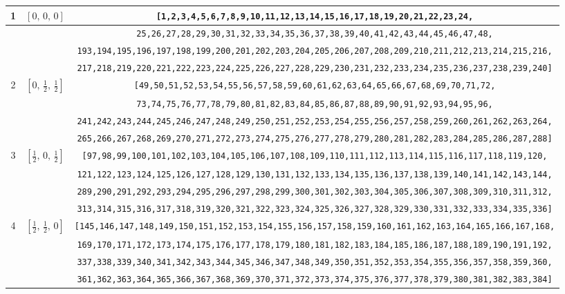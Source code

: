 \documentclass[fleqn,8pt]{jsarticle}
\begin{document}
\begin{longtable}{ccc}
1 & $\left[ 0,\, 0,\, 0 \right]$ & {\tt [1,2,3,4,5,6,7,8,9,10,11,12,13,14,15,16,17,18,19,20,21,22,23,24,} \\ \hline
 &  & {\tt 25,26,27,28,29,30,31,32,33,34,35,36,37,38,39,40,41,42,43,44,45,46,47,48,} \\ \hline
 &  & {\tt 193,194,195,196,197,198,199,200,201,202,203,204,205,206,207,208,209,210,211,212,213,214,215,216,} \\ \hline
 &  & {\tt 217,218,219,220,221,222,223,224,225,226,227,228,229,230,231,232,233,234,235,236,237,238,239,240]} \\ \hline
2 & $\left[ 0,\, \frac{1}{2},\, \frac{1}{2} \right]$ & {\tt [49,50,51,52,53,54,55,56,57,58,59,60,61,62,63,64,65,66,67,68,69,70,71,72,} \\ \hline
 &  & {\tt 73,74,75,76,77,78,79,80,81,82,83,84,85,86,87,88,89,90,91,92,93,94,95,96,} \\ \hline
 &  & {\tt 241,242,243,244,245,246,247,248,249,250,251,252,253,254,255,256,257,258,259,260,261,262,263,264,} \\ \hline
 &  & {\tt 265,266,267,268,269,270,271,272,273,274,275,276,277,278,279,280,281,282,283,284,285,286,287,288]} \\ \hline
3 & $\left[ \frac{1}{2},\, 0,\, \frac{1}{2} \right]$ & {\tt [97,98,99,100,101,102,103,104,105,106,107,108,109,110,111,112,113,114,115,116,117,118,119,120,} \\ \hline
 &  & {\tt 121,122,123,124,125,126,127,128,129,130,131,132,133,134,135,136,137,138,139,140,141,142,143,144,} \\ \hline
 &  & {\tt 289,290,291,292,293,294,295,296,297,298,299,300,301,302,303,304,305,306,307,308,309,310,311,312,} \\ \hline
 &  & {\tt 313,314,315,316,317,318,319,320,321,322,323,324,325,326,327,328,329,330,331,332,333,334,335,336]} \\ \hline
4 & $\left[ \frac{1}{2},\, \frac{1}{2},\, 0 \right]$ & {\tt [145,146,147,148,149,150,151,152,153,154,155,156,157,158,159,160,161,162,163,164,165,166,167,168,} \\ \hline
 &  & {\tt 169,170,171,172,173,174,175,176,177,178,179,180,181,182,183,184,185,186,187,188,189,190,191,192,} \\ \hline
 &  & {\tt 337,338,339,340,341,342,343,344,345,346,347,348,349,350,351,352,353,354,355,356,357,358,359,360,} \\ \hline
 &  & {\tt 361,362,363,364,365,366,367,368,369,370,371,372,373,374,375,376,377,378,379,380,381,382,383,384]} \\
\end{longtable}
\end{document}

